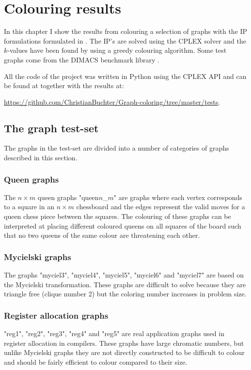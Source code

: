 \chapter{Colouring results}\label{chap:Results}
In this chapter I show the results from colouring a selection of graphs with the IP formulations formulated in . The IP's are solved using the CPLEX\cite{cplex} solver and the $k$-values have been found by using a greedy colouring algorithm.
Some test graphs come from the DIMACS benchmark library \cite{dimacs}.

\noindent All the code of the project was written in Python using the CPLEX API and can be found at together with the results at:

\noindent \url{https://github.com/ChristianBuchter/Graph-coloring/tree/master/tests}.
\section{The graph test-set}
The graphs in the test-set are divided into a number of categories of graphs described in this section.
\subsection{Queen graphs}
The $n\times m$ queen graphs "queen$n$\_$m$" are graphs where each vertex corresponds to a square in an $n \times m$ chessboard and the edges represent the valid moves for a queen chess piece between the squares. The colouring of these graphs can be interpreted at placing different coloured queens on all squares of the board such that no two queens of the same colour are threatening each other.
\subsection{Mycielski graphs}
The graphs "myciel3", "myciel4", "myciel5", "myciel6" and "myciel7" are based on the Mycielski transformation. These graphs are difficult to solve because they are triangle free (clique number 2) but the coloring number increases in problem size.
\subsection{Register allocation graphs}
"reg1", "reg2", "reg3", "reg4" and "reg5" are real application graphs used in register allocation in compilers. These graphs have large chromatic numbers, but unlike Mycielski graphs they are not directly constructed to be difficult to colour and should be fairly efficient to colour compared to their size.
